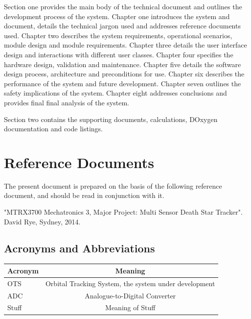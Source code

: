 \documentclass[]{report}
\begin{document}
Section one provides the main body of the technical document and outlines the development process of the system.\newline
Chapter one introduces the system and document, details the technical jargon used and addresses reference documents used. \newline
Chapter two describes the system requirements, operational scenarios, module design and module requirements. \newline
Chapter three details the user interface design and interactions with different user classes. \newline
Chapter four specifies the hardware design, validation and maintenance. \newline
Chapter five details the software design process, architecture and preconditions for use. \newline
Chapter six describes the performance of the system and future development. \newline
Chapter seven outlines the safety implications of the system. \newline
Chapter eight addresses conclusions and provides final final analysis of the system. \newline

Section two contains the supporting documents, calculations, DOxygen documentation and code listings.

\section{Reference Documents}
The present document is prepared on the basis of the following reference document, and should be read in conjunction with it.\newline

"MTRX3700 Mechatronics 3, Major Project: Multi Sensor Death Star Tracker".  David Rye, Sydney, 2014.
\subsection{Acronyms and Abbreviations}

\begin{center}
	\begin{tabular}{| l | c |}
		\hline
		Acronym & Meaning \\ \hline \hline
		OTS & Orbital Tracking System, the system under development \\ \hline
		ADC & Analogue-to-Digital Converter \\ \hline
		Stuff & Meaning of Stuff \\
		\hline
	\end{tabular}
\end{center}
\end{document}
